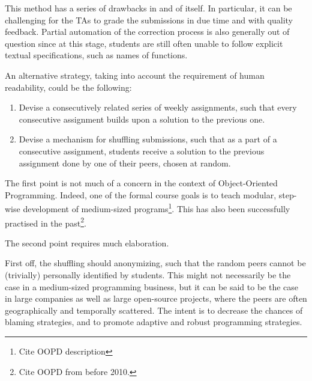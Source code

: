 This method has a series of drawbacks in and of itself. In particular, it can
be challenging for the TAs to grade the submissions in due time and with
quality feedback. Partial automation of the correction process is also
generally out of question since at this stage, students are still often unable
to follow explicit textual specifications, such as names of functions.

An alternative strategy, taking into account the requirement of human
readability, could be the following:

\begin{enumerate}

\item Devise a consecutively related series of weekly assignments, such
that every consecutive assignment builds upon a solution to the previous one.

\item Devise a mechanism for shuffling submissions, such that as a part of a
consecutive assignment, students receive a solution to the previous assignment
done by one of their peers, chosen at random.

\end{enumerate}

The first point is not much of a concern in the context of Object-Oriented
Programming.  Indeed, one of the formal course goals is to teach modular,
step-wise development of medium-sized programs\footnote{Cite OOPD description}.
This has also been successfully practised in the past\footnote{Cite OOPD from
before 2010.}.

The second point requires much elaboration.

First off, the shuffling should anonymizing, such that the random peers cannot
be (trivially) personally identified by students. This might not necessarily be
the case in a medium-sized programming business, but it can be said to be the
case in large companies as well as large open-source projects, where the peers
are often geographically and temporally scattered. The intent is to decrease
the chances of blaming strategies, and to promote adaptive and robust
programming strategies.

